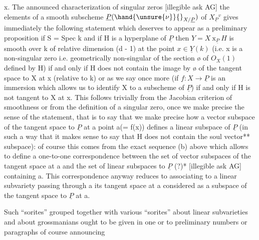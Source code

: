 
x.  The announced characterization of singular zeros [illegible
ask AG] the elements of a smooth subscheme $\underline{P}(\hand{\unsure{\nu}}{}_{X/\underline{P}})$ of $X_{\underline{P}}{}^{v}$ gives
immediately the following statement which deserves to appear as a
preliminary proposition if S = Spec k and if H is a hyperplane of
$\underline{P}$ then $Y = X \ \mathrm{x}_{\underline{P}}\ H$ is smooth over k of relative dimension (d - 1)
at the point $x \in \underline{Y}(k)$ (i.e. x is a non-singular zero i.e.
geometrically non-singular of the section {\o} of $O_X(1)$ defined by H)
if and only if H does not contain the image by {\o} of the tangent
space to X at x (relative to k) or as we say once more (if
$f{:}X \to \underline{P}$ is an immersion which allows us to identify X to a
subscheme of $\underline{P}$) if and only if H is not tangent to X at x.  This
follows trivially from the Jacobian criterion of smoothness or
from the definition of a singular zero, once we make precise the
sense of the statement, that is to say that we make precise how a
vector subspace of the tangent space to $\underline{P}$ at a point a(= f(x))
defines a linear subspace of $\underline{P}$ (in such a way that it makes sense
to say that H does not contain the soul vector** subspace): of
course this comes from the exact sequence (b) above which allows
to define a one-to-one correspondence between the set of vector
subspaces of the tangent space at a and the set of linear
subspaces to $\underline{P}$ (?)* [illegible ask AG] containing a.  This
correspondence anyway reduces to associating to a linear
subvariety passing through a its tangent space at a considered as
a subspace of the tangent space to $\underline{P}$ at a.

Such ``sorites'' grouped together with various ``sorites'' about
linear subvarieties and about grossmanians ought to be given in
one or to preliminary numbers or paragraphs of course announcing

